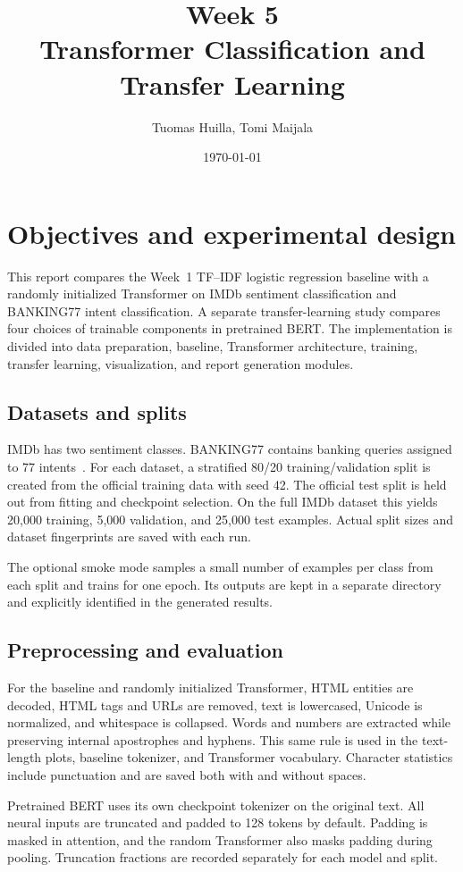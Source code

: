 \documentclass[11pt,a4paper]{article}
\title{\textbf{Week 5}\\Transformer Classification and Transfer Learning}
\author{Tuomas Huilla, Tomi Maijala}
\date{\today}
\begin{document}
\maketitle

\section{Objectives and experimental design}
This report compares the Week~1 TF--IDF logistic regression baseline with
a randomly initialized Transformer on IMDb sentiment classification and
BANKING77 intent classification. A separate transfer-learning study
compares four choices of trainable components in pretrained BERT.
The implementation is divided into data preparation, baseline,
Transformer architecture, training, transfer learning, visualization,
and report generation modules.

\subsection{Datasets and splits}
IMDb has two sentiment classes. BANKING77 contains banking queries
assigned to 77 intents~\cite{banking77}.
For each dataset, a stratified 80/20 training/validation split is created
from the official training data with seed 42. The official test split
is held out from fitting and checkpoint selection.
On the full IMDb dataset this yields 20,000 training, 5,000 validation,
and 25,000 test examples. Actual split sizes and dataset fingerprints
are saved with each run.

The optional smoke mode samples a small number of examples per class
from each split and trains for one epoch. Its outputs are kept in a
separate directory and explicitly identified in the generated results.

\subsection{Preprocessing and evaluation}
For the baseline and randomly initialized Transformer, HTML entities
are decoded, HTML tags and URLs are removed, text is lowercased, Unicode
is normalized, and whitespace is collapsed. Words and numbers are
extracted while preserving internal apostrophes and hyphens. This same
rule is used in the text-length plots, baseline tokenizer, and
Transformer vocabulary. Character statistics include punctuation and
are saved both with and without spaces.

Pretrained BERT uses its own checkpoint tokenizer on the original text.
All neural inputs are truncated and padded to 128 tokens by default.
Padding is masked in attention, and the random Transformer also masks
padding during pooling. Truncation fractions are recorded separately
for each model and split.
\end{document}
